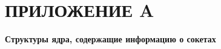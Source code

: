 \section*{ПРИЛОЖЕНИЕ A}\label{sec:app-A}
\begin{center}
	\textbf{Структуры ядра, содержащие информацию о сокетах}
\end{center}
